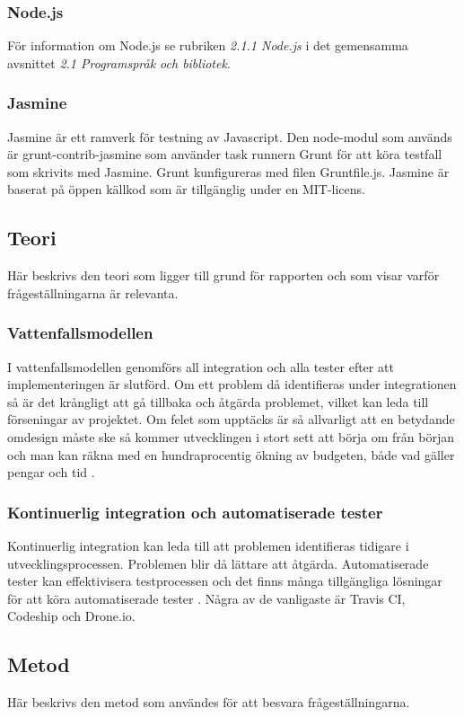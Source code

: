 \subsubsection{Node.js}
För information om Node.js se rubriken \emph{2.1.1 Node.js}
i det gemensamma avsnittet \emph{2.1 Programspråk och bibliotek}.

\subsubsection{Jasmine}
Jasmine är ett ramverk för testning av Javascript. 
Den node-modul som används är grunt-contrib-jasmine som använder task runnern Grunt 
för att köra testfall som skrivits med Jasmine.
Grunt kunfigureras med filen Gruntfile.js. Jasmine är baserat på öppen källkod
som är tillgänglig under en MIT-licens.

\subsection{Teori}
Här beskrivs den teori som ligger till grund för rapporten och som visar
varför frågeställningarna är relevanta.

\subsubsection{Vattenfallsmodellen}
I vattenfallsmodellen genomförs all integration och alla tester efter att implementeringen är slutförd. 
Om ett problem då identifieras under integrationen så är det krångligt att gå 
tillbaka och åtgärda problemet, vilket 
kan leda till förseningar av projektet.
Om felet som upptäcks är så allvarligt att en betydande omdesign måste ske så
kommer utvecklingen i stort sett att börja om från början och man kan räkna 
med en hundraprocentig ökning av budgeten, 
både vad gäller pengar och tid \cite{Royce}.

\subsubsection{Kontinuerlig integration och automatiserade tester}
Kontinuerlig integration kan leda till att problemen identifieras tidigare i 
utvecklingsprocessen. Problemen blir då lättare att åtgärda. Automatiserade tester kan effektivisera 
testprocessen och det finns många tillgängliga lösningar för att köra automatiserade
tester \cite{Karlsson}.
Några av de vanligaste är Travis CI, Codeship och Drone.io.

\subsection{Metod}
Här beskrivs den metod som användes för att 
besvara frågeställningarna.

